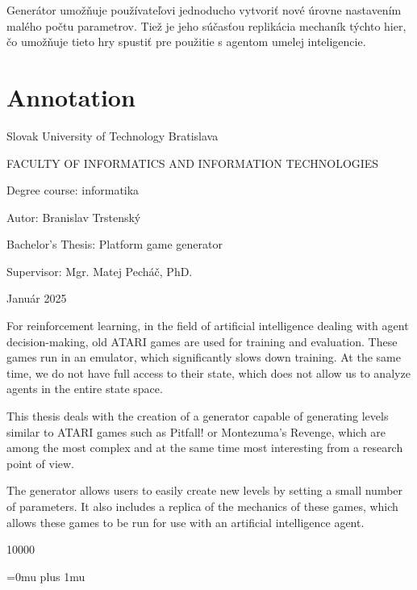 \documentclass[11pt,slovak,a4paper,usepdftitle=false]{article}
\begin{document}
Generátor umožňuje používateľovi jednoducho vytvoriť nové úrovne nastavením malého počtu parametrov. Tiež je jeho súčasťou replikácia mechaník týchto hier, čo umožňuje tieto hry spustiť pre použitie s agentom umelej inteligencie.

\newpage

\null \thispagestyle{empty}

\newpage

\section*{Annotation}

Slovak University of Technology Bratislava

FACULTY OF INFORMATICS AND INFORMATION TECHNOLOGIES


Degree course: \tab informatika

Autor: \tab Branislav Trstenský

Bachelor's Thesis: \tab Platform game generator

Supervisor: \tab Mgr. Matej Pecháč, PhD.

Január 2025

For reinforcement learning, in the field of artificial intelligence dealing with agent decision-making, old ATARI games are used for training and evaluation. These games run in an emulator, which significantly slows down training. At the same time, we do not have full access to their state, which does not allow us to analyze agents in the entire state space.

This thesis deals with the creation of a generator capable of generating levels similar to ATARI games such as Pitfall! or Montezuma's Revenge, which are among the most complex and at the same time most interesting from a research point of view.

The generator allows users to easily create new levels by setting a small number of parameters. It also includes a replica of the mechanics of these games, which allows these games to be run for use with an artificial intelligence agent.

\newpage

\null \thispagestyle{empty}

\newpage

\thispagestyle{plain}
\tableofcontents

\newpage

\null \thispagestyle{empty}

\newpage

\setcounter{page}{1}

 10000


\newpage

\Urlmuskip=0mu plus 1mu
\def\UrlBreaks{\do\/\do-}




\newpage


\end{document}
